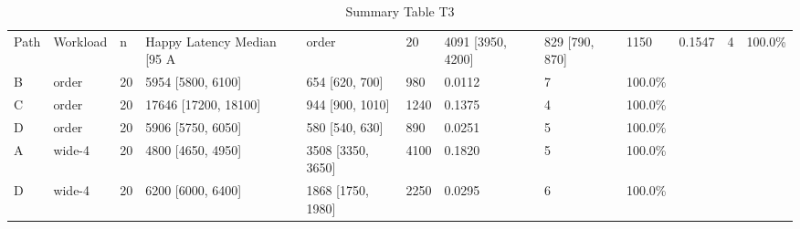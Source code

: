 \begin{table}[htbp]
\centering
\caption{Summary Table T3}
\label{tab:t3}
\begin{tabular}{lllllllll}
\toprule
Path & Workload & n & Happy Latency Median [95%
\midrule
A & order & 20 & 4091 [3950, 4200] & 829 [790, 870] & 1150 & 0.1547 & 4 & 100.0\% \\
B & order & 20 & 5954 [5800, 6100] & 654 [620, 700] & 980 & 0.0112 & 7 & 100.0\% \\
C & order & 20 & 17646 [17200, 18100] & 944 [900, 1010] & 1240 & 0.1375 & 4 & 100.0\% \\
D & order & 20 & 5906 [5750, 6050] & 580 [540, 630] & 890 & 0.0251 & 5 & 100.0\% \\
A & wide-4 & 20 & 4800 [4650, 4950] & 3508 [3350, 3650] & 4100 & 0.1820 & 5 & 100.0\% \\
D & wide-4 & 20 & 6200 [6000, 6400] & 1868 [1750, 1980] & 2250 & 0.0295 & 6 & 100.0\% \\
\bottomrule
\end{tabular}
\end{table}
